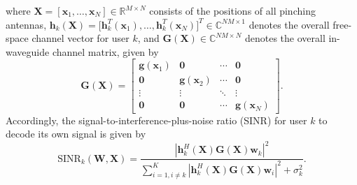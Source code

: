 where $\mathbf{X} = [\mathbf{x}_1,\dots,\mathbf{x}_N] \in \mathbb{R}^{M \times N}$ consists of the positions of all pinching antennas, $\mathbf{h}_k (\mathbf{X}) = \big[\mathbf{h}_k^T(\mathbf{x}_1),\dots,\mathbf{h}_k^T(\mathbf{x}_N)\big]^T \in \mathbb{C}^{NM \times 1}$ denotes the overall free-space channel vector for user $k$, and $\mathbf{G}(\mathbf{X}) \in \mathbb{C}^{NM \times N}$ denotes the overall in-waveguide channel matrix, given by 
\begin{equation}
    \mathbf{G}(\mathbf{X}) = \begin{bmatrix}
        \mathbf{g}(\mathbf{x}_1) & \mathbf{0} & \cdots & \mathbf{0}\\
        \mathbf{0} & \mathbf{g}(\mathbf{x}_2) & \cdots & \mathbf{0} \\
        \vdots & \vdots & \ddots &  \vdots \\
        \mathbf{0} & \mathbf{0} & \cdots & \mathbf{g}(\mathbf{x}_N)
    \end{bmatrix}.
\end{equation}
Accordingly, the signal-to-interference-plus-noise ratio (SINR) for user $k$ to decode its own signal is given by
\begin{equation} \label{SINR_formula}
    \mathrm{SINR}_k(\mathbf{W}, \mathbf{X}) = \frac{ \left| \mathbf{h}_k^H(\mathbf{X}) \mathbf{G}(\mathbf{X}) \mathbf{w}_k \right|^2 }{\sum_{i = 1, i \neq k}^K \left| \mathbf{h}_k^H(\mathbf{X}) \mathbf{G}(\mathbf{X}) \mathbf{w}_i \right|^2 + \sigma_k^2}.
\end{equation} 

